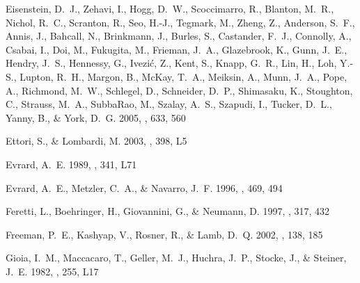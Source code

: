 \documentclass[12pt,preprint]{aastex}
\begin{document}
\begin{thebibliography}{}
{Eisenstein}, D.~J., {Zehavi}, I., {Hogg}, D.~W., {Scoccimarro}, R., {Blanton},
  M.~R., {Nichol}, R.~C., {Scranton}, R., {Seo}, H.-J., {Tegmark}, M., {Zheng},
  Z., {Anderson}, S.~F., {Annis}, J., {Bahcall}, N., {Brinkmann}, J., {Burles},
  S., {Castander}, F.~J., {Connolly}, A., {Csabai}, I., {Doi}, M., {Fukugita},
  M., {Frieman}, J.~A., {Glazebrook}, K., {Gunn}, J.~E., {Hendry}, J.~S.,
  {Hennessy}, G., {Ivezi{\'c}}, Z., {Kent}, S., {Knapp}, G.~R., {Lin}, H.,
  {Loh}, Y.-S., {Lupton}, R.~H., {Margon}, B., {McKay}, T.~A., {Meiksin}, A.,
  {Munn}, J.~A., {Pope}, A., {Richmond}, M.~W., {Schlegel}, D., {Schneider},
  D.~P., {Shimasaku}, K., {Stoughton}, C., {Strauss}, M.~A., {SubbaRao}, M.,
  {Szalay}, A.~S., {Szapudi}, I., {Tucker}, D.~L., {Yanny}, B., \& {York},
  D.~G. 2005, \apj, 633, 560

{Ettori}, S., \& {Lombardi}, M. 2003, \aap, 398, L5

{Evrard}, A.~E. 1989, \apjl, 341, L71

{Evrard}, A.~E., {Metzler}, C.~A., \& {Navarro}, J.~F. 1996, \apj, 469, 494

{Feretti}, L., {Boehringer}, H., {Giovannini}, G., \& {Neumann}, D. 1997, \aap,
  317, 432

{Freeman}, P.~E., {Kashyap}, V., {Rosner}, R., \& {Lamb}, D.~Q. 2002, \apjs,
  138, 185

{Gioia}, I.~M., {Maccacaro}, T., {Geller}, M.~J., {Huchra}, J.~P., {Stocke},
  J., \& {Steiner}, J.~E. 1982, \apjl, 255, L17


\end{thebibliography}
\end{document}

